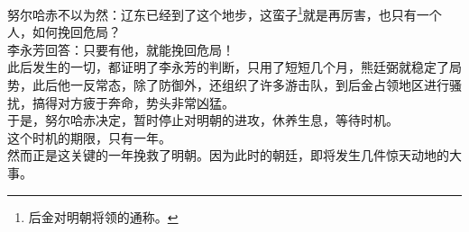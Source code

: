 \begin{multicols}{\theparacolNo}
努尔哈赤不以为然：辽东已经到了这个地步，这蛮子\footnote{后金对明朝将领的通称。}就是再厉害，也只有一个人，如何挽回危局？\\

李永芳回答：只要有他，就能挽回危局！\\

此后发生的一切，都证明了李永芳的判断，只用了短短几个月，熊廷弼就稳定了局势，此后他一反常态，除了防御外，还组织了许多游击队，到后金占领地区进行骚扰，搞得对方疲于奔命，势头非常凶猛。\\

于是，努尔哈赤决定，暂时停止对明朝的进攻，休养生息，等待时机。\\

这个时机的期限，只有一年。\\

然而正是这关键的一年挽救了明朝。因为此时的朝廷，即将发生几件惊天动地的大事。\\
\ifnum{}
	\end{multicols}
\fi
\newpage
